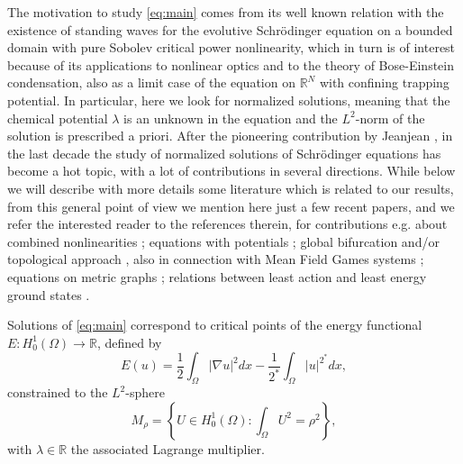 \documentclass[10pt]{article}
\newcommand{\R}{\mathbb{R}}
\theoremstyle{definition}
\numberwithin{equation}{section}
\begin{document}
The motivation to study \eqref{eq:main} comes from its well known relation with 
the existence of standing waves for the evolutive Schr\"odinger equation on a 
bounded domain with pure Sobolev critical power nonlinearity, which in turn 
is of interest because of its applications to nonlinear optics and to the theory 
of Bose-Einstein condensation, also as a limit case of the equation on $\R^N$ 
with confining trapping potential. In particular, here we look for normalized 
solutions, meaning that the chemical potential $\lambda$ is an unknown in the 
equation and the $L^2$-norm of the solution is prescribed a priori. After the 
pioneering contribution by Jeanjean \cite{MR1430506}, in the last decade the study of 
normalized solutions of Schr\"odinger equations has become a hot topic, with a lot of 
contributions in several directions. While below we will describe with more details  
some literature which is related to our results, from this general point of view  
we mention here just a few recent papers, and we refer the interested reader to the 
references therein, for contributions e.g. about combined nonlinearities \cite{MR4107073,MR4096725,MR4433054,MR4476243}; equations with potentials \cite{MR4304693,MR4443784}; global bifurcation and/or topological approach \cite{MR4297197,MR4603876,MR4701352}, also in connection with 
Mean Field Games systems \cite{MR3660463,MR4191345,MR4570263}; equations on metric graphs \cite{MR4404069,MR4132757,MR4601303,MR4371084,MR4241295}; relations between least action and least energy ground states \cite{MR4566699}.


Solutions of \eqref{eq:main} correspond to critical points of the energy functional $E:H^{1}_{0}(\Omega)\rightarrow \mathbb{R}$, defined by
\begin{equation}\label{func:main0}
E(u)=\frac{1}{2}\int_{\Omega}|\nabla u|^{2}dx-\frac{1}{2^{*}}\int_{\Omega}|u|^{2^{*}}dx,
\end{equation}
constrained to the $L^{2}$-sphere
\begin{equation}\label{manifold:0}
M_{\rho}=\left\{U\in H^{1}_{0}(\Omega): \int_{\Omega} U^{2}=\rho^{2}\right\},
\end{equation}
with $\lambda\in\R$ the associated Lagrange multiplier.
\end{document}
